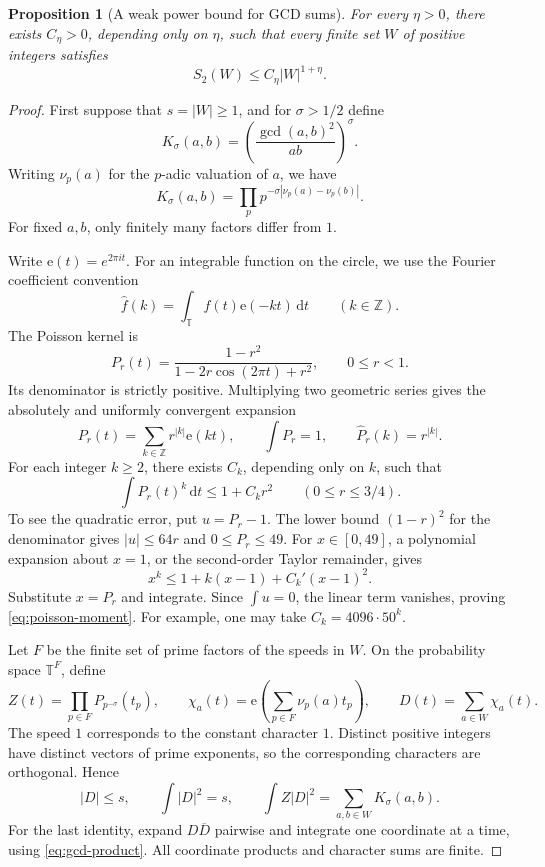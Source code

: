 \documentclass[12pt,leqno]{article}
\numberwithin{equation}{section}
\newtheorem{proposition}[theorem]{Proposition}
\theoremstyle{remark}
\newcommand{\LRtorus}{\mathbb T}
\newcommand{\LRinteger}{\mathbb Z}
\newcommand{\LRdifferential}{\,\mathrm d}
\begin{document}
\begin{proposition}[A weak power bound for GCD sums]\label{prop:gcdweak}
For every $\eta>0$, there exists $C_\eta>0$, depending only on $\eta$, such that every finite set $W$ of positive integers satisfies
\begin{equation}\label{eq:gcdsum}
S_2(W)\le C_\eta|W|^{1+\eta}.
\end{equation}
\end{proposition}
\begin{proof}
First suppose that $s=|W|\ge1$, and for $\sigma>1/2$ define
\[
K_\sigma(a,b)=\left(\frac{\gcd(a,b)^2}{ab}\right)^\sigma.
\]
Writing $\nu_p(a)$ for the $p$-adic valuation of $a$, we have
\begin{equation}\label{eq:gcd-product}
K_\sigma(a,b)=\prod_p p^{-\sigma|\nu_p(a)-\nu_p(b)|}.
\end{equation}
For fixed $a,b$, only finitely many factors differ from $1$.

Write $\mathrm e(t)=e^{2\pi i t}$. For an integrable function on the circle, we use the Fourier coefficient convention
\[
\widehat f(k)=\int_{\LRtorus}f(t)\mathrm e(-kt)\LRdifferential t\qquad(k\in\LRinteger).
\]
The Poisson kernel is
\[
P_r(t)=\frac{1-r^2}{1-2r\cos(2\pi t)+r^2},\qquad 0\le r<1.
\]
Its denominator is strictly positive. Multiplying two geometric series gives the absolutely and uniformly convergent expansion
\[
P_r(t)=\sum_{k\in\LRinteger}r^{|k|}\mathrm e(kt),\qquad
\int P_r=1,\qquad \widehat P_r(k)=r^{|k|}.
\]
For each integer $k\ge2$, there exists $C_k$, depending only on $k$, such that
\begin{equation}\label{eq:poisson-moment}
\int P_r(t)^k\LRdifferential t\le1+C_kr^2\qquad(0\le r\le3/4).
\end{equation}
To see the quadratic error, put $u=P_r-1$. The lower bound $(1-r)^2$ for the denominator gives $|u|\le64r$ and $0\le P_r\le49$. For $x\in[0,49]$, a polynomial expansion about $x=1$, or the second-order Taylor remainder, gives
\[
x^k\le1+k(x-1)+C_k'(x-1)^2.
\]
Substitute $x=P_r$ and integrate. Since $\int u=0$, the linear term vanishes, proving \eqref{eq:poisson-moment}. For example, one may take $C_k=4096\cdot50^k$.

Let $F$ be the finite set of prime factors of the speeds in $W$. On the probability space $\LRtorus^F$, define
\[
Z(t)=\prod_{p\in F}P_{p^{-\sigma}}(t_p),\qquad
\chi_a(t)=\mathrm e\left(\sum_{p\in F}\nu_p(a)t_p\right),\qquad
D(t)=\sum_{a\in W}\chi_a(t).
\]
The speed $1$ corresponds to the constant character $1$. Distinct positive integers have distinct vectors of prime exponents, so the corresponding characters are orthogonal. Hence
\begin{equation}\label{eq:poisson-representation}
|D|\le s,\qquad \int |D|^2=s,\qquad
\int Z|D|^2=\sum_{a,b\in W}K_\sigma(a,b).
\end{equation}
For the last identity, expand $D\overline D$ pairwise and integrate one coordinate at a time, using \eqref{eq:gcd-product}. All coordinate products and character sums are finite.


\end{proof}
\end{document}
